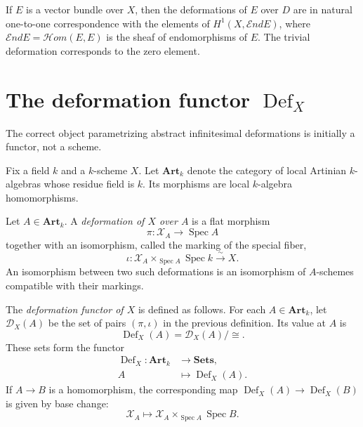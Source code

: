 \begin{corollary}
\label{lemma-vector-bundle-first-order}
If $E$ is a vector bundle over $X$, then the
deformations of $E$ over $D$ are in natural
one-to-one correspondence with the elements
of $H^1(X,\mathcal{E}nd E)$, where
$\mathcal{E}nd E=\mathcal{H}om(E,E)$ is the
sheaf of endomorphisms of $E$. The trivial
deformation corresponds to the zero element.
\end{corollary}



\section{The deformation functor
\texorpdfstring
{$\operatorname{Def}_X$}{Def X}}
\label{section-deformation-functor}

\noindent
The correct object parametrizing abstract
infinitesimal deformations is initially a
functor, not a scheme.

Fix a field $k$ and a $k$-scheme $X$. Let
$\mathbf{Art}_k$ denote the category of
local Artinian $k$-algebras whose residue
field is $k$. Its morphisms are local
$k$-algebra homomorphisms.

\begin{definition}
\label{definition-deformation-artin}
Let $A\in\mathbf{Art}_k$. A
\emph{deformation of $X$ over $A$} is a
flat morphism
$$
\pi:\mathcal{X}_A\longrightarrow
\operatorname{Spec}A
$$
together with an isomorphism, called the
marking of the special fiber,
$$
\iota:\mathcal{X}_A
\times_{\operatorname{Spec}A}
\operatorname{Spec}k\xrightarrow{\sim}X.
$$
An isomorphism between two such deformations
is an isomorphism of $A$-schemes compatible
with their markings.
\end{definition}

\begin{definition}
\label{definition-def-x}
The \emph{deformation functor of $X$} is
defined as follows. For each
$A\in\mathbf{Art}_k$, let $\mathcal{D}_X(A)$
be the set of pairs $(\pi,\iota)$ in the
previous definition. Its value at $A$ is
$$
\operatorname{Def}_X(A)
=
\mathcal{D}_X(A)/{\cong}.
$$
These sets form the functor
$$
\begin{aligned}
\operatorname{Def}_X:
\mathbf{Art}_k&\longrightarrow
\mathbf{Sets},\\
A&\longmapsto
\operatorname{Def}_X(A).
\end{aligned}
$$
If $A\to B$ is a homomorphism, the
corresponding map
$\operatorname{Def}_X(A)\to
\operatorname{Def}_X(B)$ is given by base
change:
$$
\mathcal{X}_A\longmapsto
\mathcal{X}_A\times_{\operatorname{Spec}A}
\operatorname{Spec}B.
$$
\end{definition}

